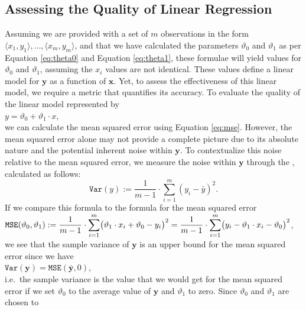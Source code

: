\subsection{Assessing the Quality of Linear Regression}
Assuming we are provided with a set of $m$ observations in the form $\langle x_1, y_1\rangle, \ldots, \langle
x_m, y_m\rangle$, and that we have calculated the parameters $\vartheta_0$ and $\vartheta_1$ as per Equation
\ref{eq:theta0} and Equation \ref{eq:theta1}, these formulae will yield values for $\vartheta_0$ and
$\vartheta_1$, assuming the $x_i$ values are not identical. These values define a linear model for $\mathbf{y}$
as a function of $\mathbf{x}$. Yet, to assess the effectiveness of this linear model, we require a metric that
quantifies its accuracy. To evaluate the quality of the linear model represented by 
\\[0.2cm]
\hspace*{1.3cm}
$y = \vartheta_0 + \vartheta_1 \cdot x$,
\\[0.2cm]
we can calculate the mean squared error using Equation \ref{eq:mse}. However, the mean squared error alone may
not provide a complete picture due to its absolute nature and the potential inherent noise within
$\mathbf{y}$. To contextualize this noise relative to the mean squared error, we measure the noise within
$\mathbf{y}$ through the  , calculated as follows: 
\begin{equation}
  \label{eq:var}
  \mathtt{Var}(y) := \frac{1}{m-1} \cdot \sum_{i=1}^m (y_i - \bar{y})^2.
\end{equation}
If we compare this formula to the formula for the mean squared error
\\[0.2cm]
\hspace*{1.3cm}
$\displaystyle\mathtt{MSE}(\vartheta_0, \vartheta_1) := 
    \frac{1}{m-1} \cdot\sum\limits_{i=1}^m \bigl(\vartheta_1 \cdot x_i + \vartheta_0 - y_i\bigr)^2
=   \frac{1}{m-1} \cdot\sum\limits_{i=1}^m \bigl(y_i - \vartheta_1 \cdot x_i - \vartheta_0\bigr)^2
$,
\\[0.2cm]
we see that the sample variance of $\mathbf{y}$ is an upper bound for the mean squared error since we have
\\[0.2cm]
\hspace*{1.3cm}
$\mathtt{Var}(\mathbf{y}) = \mathtt{MSE}(\bar{\mathbf{y}}, 0)$,
\\[0.2cm]
i.e.~the sample variance is the value that we would get for the mean squared error if we set $\vartheta_0$ to
the average value of $\mathbf{y}$ and $\vartheta_1$ to zero.  Since $\vartheta_0$ and $\vartheta_1$ are chosen to
